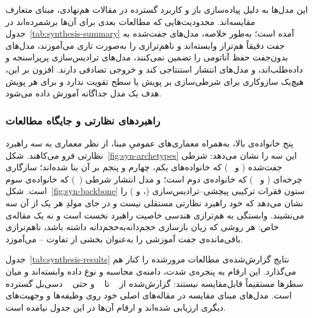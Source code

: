 این مدل‌ها به دلیل پیاده‌سازی باز و کاربرد گسترده در مقالات هم‌نهادی، مبنای متعارف مقایسه‌اند. محدودیت‌هایی که مطالعات بعدی برای آن‌ها برشمرده‌اند در جدول~\ref{tab:synthesis-summary} آمده است؛ به‌طور خلاصه، مدل‌های جفت‌شده به جفت دقیقاً هم‌تراز وابسته‌اند و ناهم‌ترازی را به‌صورت تاری می‌آموزند، مدل‌های بدون‌جفت حفظ آناتومی را تضمین نمی‌کنند، مدل‌های ترادیس‌سازی پرپراسنجه و داده‌طلب‌اند، و مدل‌های انتشار استنتاجی کند و خروجی تصادفی دارند. افزون بر این، هیچ‌یک سازوکاری برای شرطی‌سازی بر پویش یا سطح تقویت ندارد و برای هر پویش هدف یک مدل جداگانه آموزش داده می‌شود.

\subsubsection*{راهبردهای نظارتی و جایگاه مطالعات}

پنج خانواده‌ی بالا، به‌همراه معماری‌های عمومیِ مبنا، از نظر معماری به سه راهبرد نظارتی فرو می‌کاهند. شکل~\ref{fig:syn-archetypes} این سه را نشان می‌دهد:  شرطی جفت‌شده ( و ~\cite{wang2018pix2pixhd}) که خانواده‌های یکم، چهارم و پنجم بر آن بنا شده‌اند؛ سازگاری چرخه‌ای ( و ~\cite{Ris21}) که خانواده‌ی دوم است؛ و مدل انتشار شرطی (~\cite{Zhe25}) که خانواده‌ی سوم است. شکل~\ref{fig:syn-backbone} ستون فقرات ترکیبی پیچشی--ترادیس‌سازی (،  و ) را نشان می‌دهد که خود راهبرد نظارتی مستقلی نیست و در جای مولدِ هر یک از آن سه می‌نشیند. وابستگی به هم‌ترازی هندسی خاصیت راهبرد نخست است و نه یک مقاله‌ی خاص: هر روشی که زیان بازسازی حجم‌دانه‌به‌حجم‌دانه داشته باشد، ناهم‌ترازی باقی‌مانده‌ی جفت آموزشی را به‌عنوان بخشی از تفاوت -- می‌آموزد.





جدول~\ref{tab:synthesis-results} نتایج گزارش‌شده‌ی مطالعات مرورشده را کنار هم می‌گذارد. این ارقام به پنجره‌ی شدت، دامنه‌ی محاسبه و نوع داده وابسته‌اند و میان سطرها مستقیماً قابل‌مقایسه نیستند:  گزارش‌شده از ~\cite{Liu22} تا ~\cite{Han24} و حتی ~\cite{Pin23} دسی‌بل گسترده است. مدل‌های مبنای مقایسه در مقاله‌های اصلی خود روی وظیفه‌ها و وجهیت‌های دیگری ارزیابی شده‌اند و ارقام آن‌ها در این جدول نیامده است.

